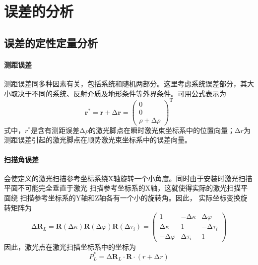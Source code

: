 \section{误差的分析}

\subsection{误差的定性定量分析}

\paragraph{测距误差}测距误差同多种因素有关，包括系统和随机两部分。这里考虑系统误差部分，其大小取决于不同的系统、反射介质及地形条件等外界条件。可用公式表示为
\begin{equation}
\symbf{r}^* = \symbf{r} + ∆\symbf{r} = \begin{pmatrix}
0 \\ 0 \\ \rho + ∆\rho
\end{pmatrix}^{\text{T}}
\end{equation}
式中，$ r^* $是含有测距误差$ ∆\rho $的激光脚点在瞬时激光束坐标系中的位置向量；$ ∆r $为测距误差引起的激光脚点在顺势激光束坐标系中的误差向量。

\paragraph{扫描角误差}会使定义的激光扫描参考坐标系绕X轴旋转一个小角度。同时由于安装时激光扫描平面不可能完全垂直于激光
扫描参考坐标系的X轴，这就使得实际的激光扫描平面绕
扫描参考坐标系的Y轴和Z轴各有一个小的旋转角。因此，
实际坐标变换旋转矩阵为
\begin{equation}
∆\symbf{R}_L = \symbf{R}(∆\kappa)\symbf{R}(∆\varphi)\symbf{R}(∆\tau_i) = 
\begin{pmatrix}
	1         & -∆\kappa & ∆\varphi \\
	∆\kappa   & 1        & -∆\tau_i \\
	-∆\varphi & ∆\tau_i  & 1
\end{pmatrix} 
\end{equation}
因此，激光点在激光扫描坐标系中的坐标为
\begin{equation}
P_L^* = ∆\symbf{\symbf{R}}_L \cdot \symbf{\symbf{R}} \cdot (r + ∆r)
\end{equation}

